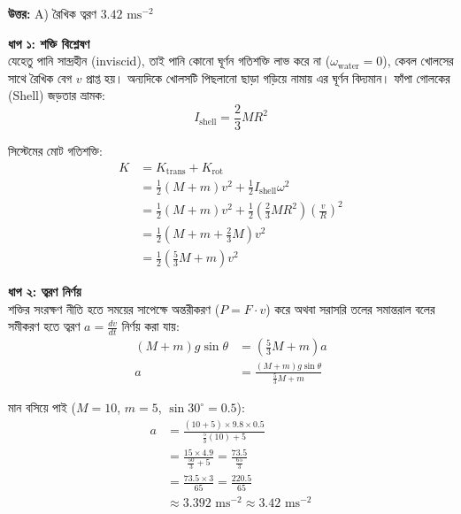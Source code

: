 \documentclass[12pt, a4paper]{article}
\begin{document}
\vspace{0.5em}
\begin{tcolorbox}[answerbox]
    \textbf{\color{success} উত্তর:} A) রৈখিক ত্বরণ $3.42\text{ ms}^{-2}$
\end{tcolorbox}
\vspace{1em}

\begin{tcolorbox}[solutionbox={সমাধান (Solution)}]
    \noindent
    \textbf{ধাপ ১: শক্তি বিশ্লেষণ} \\
    যেহেতু পানি সান্দ্রহীন (inviscid), তাই পানি কোনো ঘূর্ণন গতিশক্তি লাভ করে না ($\omega_{\text{water}} = 0$), কেবল খোলসের সাথে রৈখিক বেগ $v$ প্রাপ্ত হয়।
    অন্যদিকে খোলসটি পিছলানো ছাড়া গড়িয়ে নামায় এর ঘূর্ণন বিদ্যমান। ফাঁপা গোলকের (Shell) জড়তার ভ্রামক:
    \[ I_{\text{shell}} = \frac{2}{3} M R^2 \]
    
    সিস্টেমের মোট গতিশক্তি:
    \begin{align*}
        K &= K_{\text{trans}} + K_{\text{rot}} \\
          &= \frac{1}{2} (M + m) v^2 + \frac{1}{2} I_{\text{shell}} \omega^2 \\
          &= \frac{1}{2} (M + m) v^2 + \frac{1}{2} \left(\frac{2}{3} M R^2\right) \left(\frac{v}{R}\right)^2 \\
          &= \frac{1}{2} \left(M + m + \frac{2}{3} M\right) v^2 \\
          &= \frac{1}{2} \left(\frac{5}{3} M + m\right) v^2
    \end{align*}
    
    \vspace{0.5em}
    \noindent\textbf{ধাপ ২: ত্বরণ নির্ণয়} \\
    শক্তির সংরক্ষণ নীতি হতে সময়ের সাপেক্ষে অন্তরীকরণ ($P = F \cdot v$) করে অথবা সরাসরি তলের সমান্তরাল বলের সমীকরণ হতে ত্বরণ $a = \frac{dv}{dt}$ নির্ণয় করা যায়:
    \begin{align*}
        (M + m) g \sin\theta &= \left(\frac{5}{3} M + m\right) a \\
        a &= \frac{(M + m) g \sin\theta}{\frac{5}{3} M + m}
    \end{align*}
    
    মান বসিয়ে পাই ($M = 10$, $m = 5$, $\sin 30^\circ = 0.5$):
    \begin{align*}
        a &= \frac{(10 + 5) \times 9.8 \times 0.5}{\frac{5}{3}(10) + 5} \\
          &= \frac{15 \times 4.9}{\frac{50}{3} + 5} = \frac{73.5}{\frac{65}{3}} \\
          &= \frac{73.5 \times 3}{65} = \frac{220.5}{65} \\
          &\approx 3.392\text{ ms}^{-2} \approx \mathbf{3.42}\text{ ms}^{-2}
    \end{align*}
\end{tcolorbox}
\end{document}
